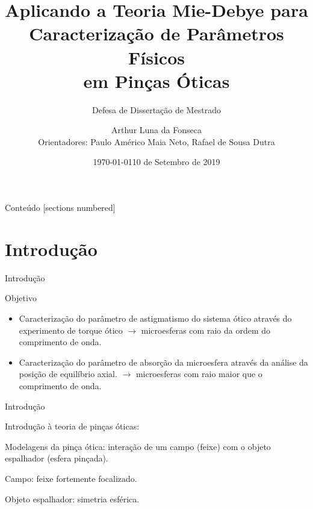 \documentclass[10pt]{beamer}
\title{Aplicando a Teoria Mie-Debye para Caracterização de Parâmetros Físicos \\em Pinças Óticas}
\subtitle{Defesa de Dissertação de Mestrado}
\date{\today}
\author{Arthur Luna da Fonseca \\Orientadores: Paulo Américo Maia Neto, Rafael de Sousa Dutra}
\date{10 de Setembro de 2019}
\institute{Instituto de Física - Universidade Federal do Rio de Janeiro}
\begin{document}
\maketitle


\begin{frame}{Conteúdo}
  [sections numbered]
  \tableofcontents[hideallsubsections]
\end{frame}


\section{Introdução}


\begin{frame}[fragile]{Introdução}
      \begin{center}
          \begin{exampleblock}{Objetivo}

		      \begin{itemize}

		        \item Caracterização do parâmetro de astigmatismo do sistema ótico através do experimento de torque ótico $\rightarrow$ microesferas com raio da ordem do comprimento de onda.

		        \item Caracterização do parâmetro de absorção da microesfera através da análise da posição de equilíbrio axial. $\rightarrow$ microesferas com raio maior que o comprimento de onda.

		      \end{itemize}

          \end{exampleblock}
      \end{center}
\end{frame}


\begin{frame}[fragile]{Introdução}

Introdução à teoria de pinças óticas: \\
    \begin{center}
        Modelagens da pinça ótica: interação de um campo (feixe) com o objeto espalhador (esfera pinçada).

        Campo: feixe fortemente focalizado.

        Objeto espalhador: simetria esférica.

        

    \end{center}

\end{frame}
\end{document}
